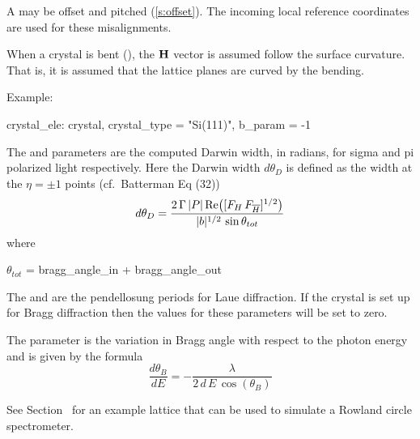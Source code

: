 A  may be offset and pitched (\ref{s:offset}). The incoming local reference coordinates
are used for these misalignments.

When a crystal is bent (), the ${\bf H}$ vector is assumed follow the surface
curvature. That is, it is assumed that the lattice planes are curved by the bending.

Example:
\begin{example}
  crystal_ele: crystal, crystal_type = "Si(111)", b_param = -1
\end{example}

The  and  parameters are the computed Darwin width, in
radians, for sigma and pi polarized light respectively. Here the Darwin width $d\theta_D$ is defined
as the width at the $\eta = \pm 1$ points (cf.~Batterman\cite{b:batterman} Eq (32))
\begin{equation}
  d\theta_D = \frac{2 \, \Gamma \, |P| \, \text{Re} \! \left( [F_H \, F_{{\overline{H}}}]^{1/2} \right)}
                 {|b|^{1/2} \, \sin\theta_{tot}}
\end{equation}
where
\begin{example}
  \(\theta_{tot}\) = bragg_angle_in + bragg_angle_out 
\end{example}

The  and  are the pendellosung periods for
Laue diffraction. If the crystal is set up for Bragg diffraction then the values for these
parameters will be set to zero.

The  parameter is the variation in Bragg angle with respect to the photon energy
and is given by the formula
\begin{equation}
  \frac{d\theta_B}{dE} = -\frac{\lambda}{2 \, d \, E \, \cos( \theta_B )}
\end{equation}

See Section~ for an example lattice that can be used to simulate a Rowland circle
spectrometer.

